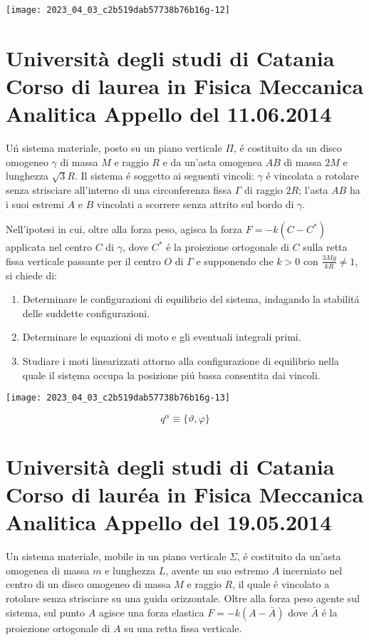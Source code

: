 \documentclass[10pt]{article}
\begin{document}
\begin{center}
\texttt{[image: 2023\_04\_03\_c2b519dab57738b76b16g-12]}
\end{center}

\section{Università degli studi di Catania
Corso di laurea in Fisica
Meccanica Analitica
Appello del 11.06.2014}
Uń sistema materiale, posto su un piano verticale \(\Pi\), é costituito da un disco omogeneo \(\gamma\) di massa \(M\) e raggio \(R\) e da un'asta omogenea \(A B\) di massa \(2 M\) e lunghezza \(\sqrt{3} R\). Il sistema é soggetto ai seguenti vincoli: \(\gamma\) é vincolata a rotolare senza strisciare all'interno di una circonferenza fissa \(\Gamma\) di raggio \(2 R\); l'asta \(A B\) ha i suoi estremi \(A\) e \(B\) vincolati a scorrere senza attrito sul bordo di \(\gamma\).

Nell'ipotesi in cui, oltre alla forza peso, agisca la forza \(F=-k\left(C-C^{*}\right)\) applicata nel centro \(C\) di \(\gamma\), dove \(C^{*}\) é la proiezione ortogonale di \(C\) sulla retta fissa verticale passante per il centro \(O\) di \(\Gamma\) e supponendo che \(k>0\) con \(\frac{3 M g}{k R} \neq 1\), si chiede di:

\begin{enumerate}
  \item Determinare le configurazioni di equilibrio del sistema, indagando la stabilitá delle suddette configurazioni.

  \item Determinare le equazioni di moto e gli eventuali integrali primi.

  \item Studiare i moti linearizzati attorno alla configurazione di equilibrio nella quale il sistẹma occupa la posizione piú bassa consentita dai vincoli.

\end{enumerate}

\begin{center}
\texttt{[image: 2023\_04\_03\_c2b519dab57738b76b16g-13]}
\end{center}

\[
q^{\alpha} \equiv\{\vartheta, \varphi\}
\]

\section{Università degli studi di Catania
Corso di lauréa in Fisica
Meccanica Analitica
Appello del 19.05.2014}
Un sistema materiale, mobile in un piano verticale \(\Sigma\), é costituito da un'asta omogenea di massa \(m\) e lunghezza \(L\), avente un suo estremo \(A\) incerniato nel centro di un disco omogeneo di massa \(M\) e raggio \(R\), il quale é vincolato a rotolare senza strisciare su una guida orizzontale. Oltre alla forza peso agente sul sistema, sul punto \(A\) agisce una forza elastica \(F=-k(A-\bar{A})\) dove \(\bar{A}\) é la proiezione ortogonale di \(A\) su una retta fissa verticale.
\end{document}
